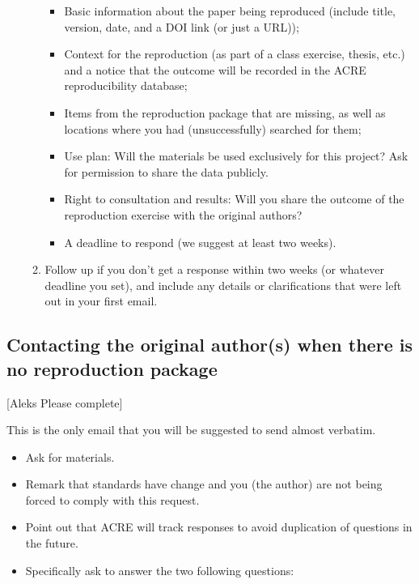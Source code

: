 \documentclass[]{book}
\providecommand{\tightlist}{%
  \setlength{\itemsep}{0pt}\setlength{\parskip}{0pt}}
\begin{document}
\begin{enumerate}
\begin{enumerate}
    \begin{itemize}
    \tightlist
    \item
      Basic information about the paper being reproduced (include title, version, date, and a DOI link (or just a URL));\\
    \item
      Context for the reproduction (as part of a class exercise, thesis, etc.) and a notice that the outcome will be recorded in the ACRE reproducibility database;\\
    \item
      Items from the reproduction package that are missing, as well as locations where you had (unsuccessfully) searched for them;\\
    \item
      Use plan: Will the materials be used exclusively for this project? Ask for permission to share the data publicly.\\
    \item
      Right to consultation and results: Will you share the outcome of the reproduction exercise with the original authors?\\
    \item
      A deadline to respond (we suggest at least two weeks).
    \end{itemize}
  \item
    Follow up if you don't get a response within two weeks (or whatever deadline you set), and include any details or clarifications that were left out in your first email.
  \end{enumerate}
\end{enumerate}

\hypertarget{contacting-the-original-authors-when-there-is-no-reproduction-package}{%
\subsection{Contacting the original author(s) when there is no reproduction package}\label{contacting-the-original-authors-when-there-is-no-reproduction-package}}

{[}Aleks Please complete{]}

This is the only email that you will be suggested to send almost verbatim.

\begin{itemize}
\tightlist
\item
  Ask for materials.
\item
  Remark that standards have change and you (the author) are not being forced to comply with this request.
\item
  Point out that ACRE will track responses to avoid duplication of questions in the future.\\
\item
  Specifically ask to answer the two following questions:
\end{itemize}
\end{document}
